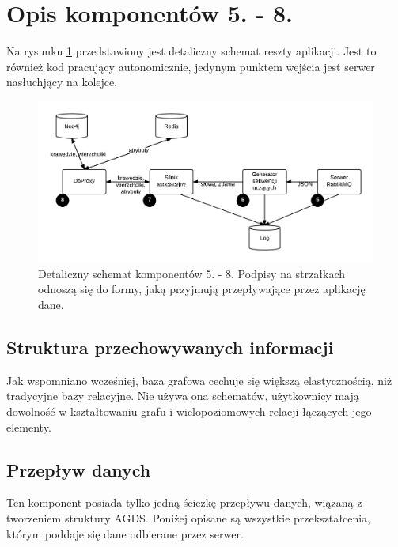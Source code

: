 \section{Opis komponentów 5. - 8.}

Na rysunku \ref{graph:neo4j} przedstawiony jest detaliczny schemat reszty aplikacji. Jest to również kod pracujący autonomicznie, jedynym punktem wejścia
jest serwer nasłuchjący na kolejce.

\begin{figure}[!h]
    \centering
    \label{graph:neo4j}
    \includegraphics[scale=0.22]{neo4j}
    \caption{Detaliczny schemat komponentów 5. - 8. Podpisy na strzałkach odnoszą się do formy, jaką przyjmują przepływające przez aplikację dane.}
\end{figure}

\subsection{Struktura przechowywanych informacji}
\label{subs:struktNeo4j}

Jak wspomniano wcześniej, baza grafowa cechuje się większą elastycznością, niż tradycyjne bazy relacyjne. Nie używa ona schematów, użytkownicy mają dowolność w kształtowaniu 
grafu i wielopoziomowych relacji łączących jego elementy.

\subsection{Przepływ danych}
\label{subs:mriPrzepDanych}

Ten komponent posiada tylko jedną ścieżkę przepływu danych, wiązaną z tworzeniem struktury AGDS. Poniżej opisane są wszystkie przekształcenia, którym poddaje się dane
odbierane przez serwer.

